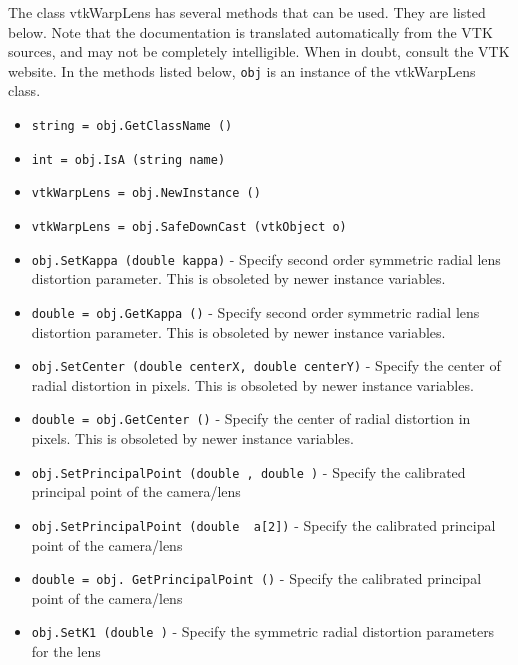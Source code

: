 The class vtkWarpLens has several methods that can be used.
  They are listed below.
Note that the documentation is translated automatically from the VTK sources,
and may not be completely intelligible.  When in doubt, consult the VTK website.
In the methods listed below, \verb|obj| is an instance of the vtkWarpLens class.
\begin{itemize}
\item  \verb|string = obj.GetClassName ()|

\item  \verb|int = obj.IsA (string name)|

\item  \verb|vtkWarpLens = obj.NewInstance ()|

\item  \verb|vtkWarpLens = obj.SafeDownCast (vtkObject o)|

\item  \verb|obj.SetKappa (double kappa)| -  Specify second order symmetric radial lens distortion parameter.
 This is obsoleted by newer instance variables.

\item  \verb|double = obj.GetKappa ()| -  Specify second order symmetric radial lens distortion parameter.
 This is obsoleted by newer instance variables.

\item  \verb|obj.SetCenter (double centerX, double centerY)| -  Specify the center of radial distortion in pixels.
 This is obsoleted by newer instance variables.

\item  \verb|double = obj.GetCenter ()| -  Specify the center of radial distortion in pixels.
 This is obsoleted by newer instance variables.

\item  \verb|obj.SetPrincipalPoint (double , double )| -  Specify the calibrated principal point of the camera/lens

\item  \verb|obj.SetPrincipalPoint (double  a[2])| -  Specify the calibrated principal point of the camera/lens

\item  \verb|double = obj. GetPrincipalPoint ()| -  Specify the calibrated principal point of the camera/lens

\item  \verb|obj.SetK1 (double )| -  Specify the symmetric radial distortion parameters for the lens


\end{itemize}
